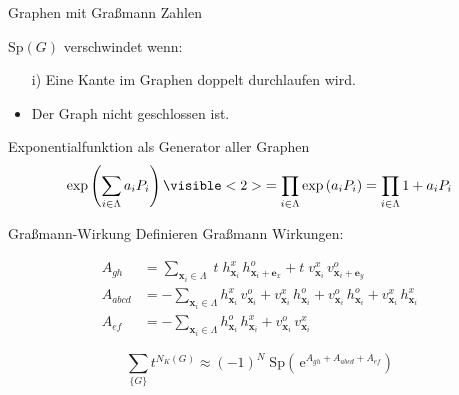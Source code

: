 \documentclass[11pt]{beamer}
\newcommand{\Sp}[1]{\mathrm{Sp}\left( #1 \right)}
\renewcommand{\exp}[1]{\mathrm{exp}\left( #1 \right)}
\begin{document}
    \begin{frame}{Graphen mit Graßmann Zahlen}
    
    $\Sp{G}$ verschwindet wenn: 
    \begin{itemize}
        \item[]
        \item[i)] Eine Kante im Graphen doppelt durchlaufen wird.
        \item[]
        \item<2-3>[ii)] Der Graph nicht geschlossen ist.
    \end{itemize}
    
    \vspace{0.8cm}
    
    \end{frame}

    \begin{frame}{Exponentialfunktion als Generator aller Graphen}
    \begin{align} \nonumber
    \exp{\sum_{i\in\Lambda} a_i P_i} \visible<2>{= \prod_{i\in\Lambda} \exp{a_i P_i} = \prod_{i\in\Lambda} 1 + a_i P_i }
    \end{align}
    \end{frame}
    
    \begin{frame}{Graßmann-Wirkung}
    Definieren Graßmann Wirkungen:
    
    \begin{equation} \nonumber
    \begin{aligned}
        A_{gh} &= \sum_{\bm{x}_i \in \Lambda} 
            \; t \; h_{\bm{x}_i}^x \,h_{\bm{x}_i+\bm{e}_x}^o
            + t \; v_{\bm{x}_i}^x \,v_{\bm{x}_i+\bm{e}_y}^o \\
        A_{abcd} &= - \sum_{\bm{x}_i \in \Lambda}  
             h_{\bm{x}_i}^x \,v_{\bm{x}_i}^o  
            +  v_{\bm{x}_i}^x\, h_{\bm{x}_i}^o 
            +  v_{\bm{x}_i}^o \,h_{\bm{x}_i}^o 
            +  v_{\bm{x}_i}^x \,h_{\bm{x}_i}^x\\
        A_{ef} &= - \sum_{\bm{x}_i \in \Lambda} 
             h_{\bm{x}_i}^o \,h_{\bm{x}_i}^x 
            +  v_{\bm{x}_i}^o \,v_{\bm{x}_i}^x
    \end{aligned}
    \end{equation}
    

    
   \pause
    \begin{grayframe}[frametitle = {Zustandssumme mit Graßmann Variablen}]
    \begin{equation} \nonumber
    \sum_{\{ G\}} t^{N_K(G)} \approx (-1)^N\; \Sp{ \,\mathrm{e}^{A_{gh} + A_{abcd} + A_{ef}}}
    \end{equation}
    \end{grayframe}
    
    \end{frame}
    
\end{document}
